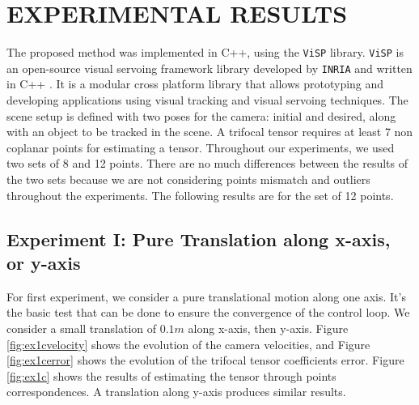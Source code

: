 \section{EXPERIMENTAL RESULTS}\label{sec:results}
The proposed method was implemented in C++, using the \texttt{ViSP} library. \texttt{ViSP} is an open-source visual servoing framework library developed by \texttt{INRIA} and written in C++ \cite{visp}. It is a modular cross platform library that allows prototyping and developing applications using visual tracking and visual servoing techniques. The scene setup is defined with two poses for the camera: initial and desired, along with an object to be tracked in the scene. A trifocal tensor requires at least 7 non coplanar points for estimating a tensor. Throughout our experiments, we used two sets of 8 and 12 points. There are no much differences between the results of the two sets because we are not considering points mismatch and outliers throughout the experiments. The following results are for the set of 12 points.

\subsection{Experiment I: Pure Translation along x-axis, or y-axis}
For first experiment, we consider a pure translational motion along one axis. It's the basic test that can be done to ensure the convergence of the control loop. We consider a small translation of $0.1m$ along x-axis, then y-axis. Figure \ref{fig:ex1cvelocity} shows the evolution of the camera velocities, and Figure \ref{fig:ex1cerror} shows the evolution of the trifocal tensor coefficients error. Figure \ref{fig:ex1c} shows the results of estimating the tensor through points correspondences. A translation along y-axis produces similar results.

